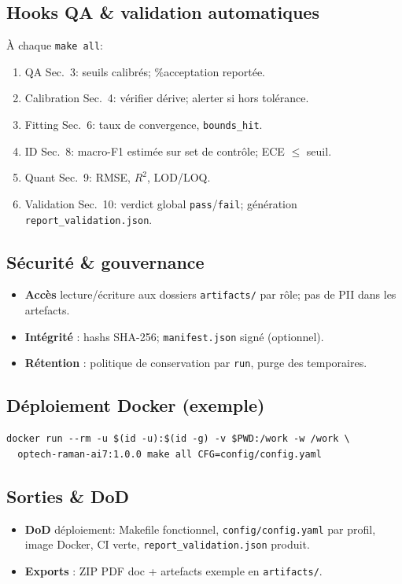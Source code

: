 \subsection{Hooks QA \& validation automatiques}
À chaque \texttt{make all}:
\begin{enumerate}[nosep]
\item QA Sec.~3: seuils calibrés; \%acceptation reportée.
\item Calibration Sec.~4: vérifier dérive; alerter si hors tolérance.
\item Fitting Sec.~6: taux de convergence, \texttt{bounds\_hit}.
\item ID Sec.~8: macro-F1 estimée sur set de contrôle; ECE $\le$ seuil.
\item Quant Sec.~9: RMSE, $R^2$, LOD/LOQ.
\item Validation Sec.~10: verdict global \texttt{pass}/\texttt{fail}; génération \texttt{report\_validation.json}.
\end{enumerate}

\subsection{Sécurité \& gouvernance}
\begin{itemize}[nosep]
\item \textbf{Accès} lecture/écriture aux dossiers \texttt{artifacts/} par rôle; pas de PII dans les artefacts.
\item \textbf{Intégrité} : hashs SHA-256; \texttt{manifest.json} signé (optionnel).
\item \textbf{Rétention} : politique de conservation par \texttt{run}, purge des temporaires.
\end{itemize}

\subsection{Déploiement Docker (exemple)}
\begin{lstlisting}[basicstyle=\ttfamily\small]
docker run --rm -u $(id -u):$(id -g) -v $PWD:/work -w /work \
  optech-raman-ai7:1.0.0 make all CFG=config/config.yaml
\end{lstlisting}

\subsection{Sorties \& DoD}
\begin{itemize}[nosep]
\item \textbf{DoD} déploiement: Makefile fonctionnel, \texttt{config/config.yaml} par profil, image Docker, CI verte, \texttt{report\_validation.json} produit.
\item \textbf{Exports} : ZIP PDF doc + artefacts exemple en \texttt{artifacts/}.
\end{itemize}
